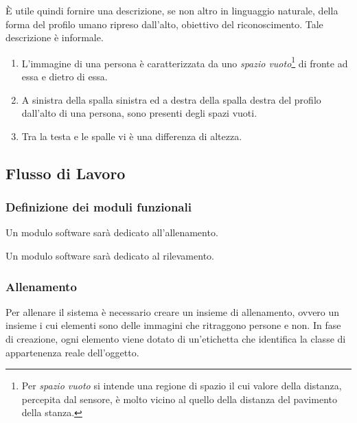                 È utile quindi fornire una descrizione, se non altro in linguaggio naturale, della forma del profilo umano ripreso dall'alto, obiettivo del riconoscimento.
                Tale descrizione è informale.

                \begin{enumerate}
                    \item L'immagine di una persona è caratterizzata da uno \emph{spazio vuoto}\footnote{Per \emph{spazio vuoto} si intende una regione di spazio il cui valore della distanza, percepita dal sensore, è molto vicino al quello della distanza del pavimento della stanza.} di fronte ad essa e dietro di essa.
                    \item A sinistra della spalla sinistra ed a destra della spalla destra del profilo dall'alto di una persona, sono presenti degli spazi vuoti.
                    \item Tra la testa e le spalle vi è una differenza di altezza.
                \end{enumerate}

        \subsection{Flusso di Lavoro}
        \label{sub:overall_workflow}
            \subsubsection{Definizione dei moduli funzionali}
                Un modulo software sarà dedicato all'allenamento.

                Un modulo software sarà dedicato al rilevamento.

            \subsubsection{Allenamento}
                Per allenare il sistema è necessario creare un insieme di allenamento, ovvero un insieme i cui elementi sono delle immagini che ritraggono persone e non.
                In fase di creazione, ogni elemento viene dotato di un'etichetta che identifica la classe di appartenenza reale dell'oggetto.

